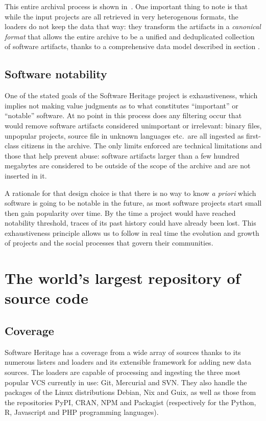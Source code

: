 This entire archival process is shown in~. One
important thing to note is that while the input projects are all retrieved in
very heterogenous formats, the loaders do not keep the data that way: they
transform the artifacts in a \emph{canonical format} that allows the entire
archive to be a unified and deduplicated collection of software artifacts,
thanks to a comprehensive data model described in section \TODO{}.

\subsection{Software notability}

One of the stated goals of the Software Heritage project is exhaustiveness,
which implies not making value judgments as to what constitutes ``important''
or ``notable'' software. At no point in this process does any filtering occur
that would remove software artifacts considered unimportant or irrelevant:
binary files, unpopular projects, source file in unknown languages etc.\ are
all ingested as first-class citizens in the archive. The only limits enforced
are technical limitations and those that help prevent abuse: software artifacts
larger than a few hundred megabytes are considered to be outside of the scope
of the archive and are not inserted in it.

A rationale for that design choice is that there is no way to know \emph{a
priori} which software is going to be notable in the future, as most software
projects start small then gain popularity over time. By the time a project
would have reached notability threshold, traces of its past history could have
already been lost. This exhaustiveness principle allows us to follow in real
time the evolution and growth of projects and the social processes that govern
their communities.

\section{The world's largest repository of source code}

\subsection{Coverage}

Software Heritage has a coverage from a wide array of sources thanks to its
numerous listers and loaders and its extensible framework for adding new data
sources. The loaders are capable of processing and ingesting the three most
popular \gls{VCS} currently in use: Git, Mercurial and SVN\@. They also handle
the packages of the Linux distributions Debian, Nix and Guix, as well as those
from the repositories PyPI, CRAN, NPM and Packagist (respectively for the
Python, R, Javascript and PHP programming languages).

